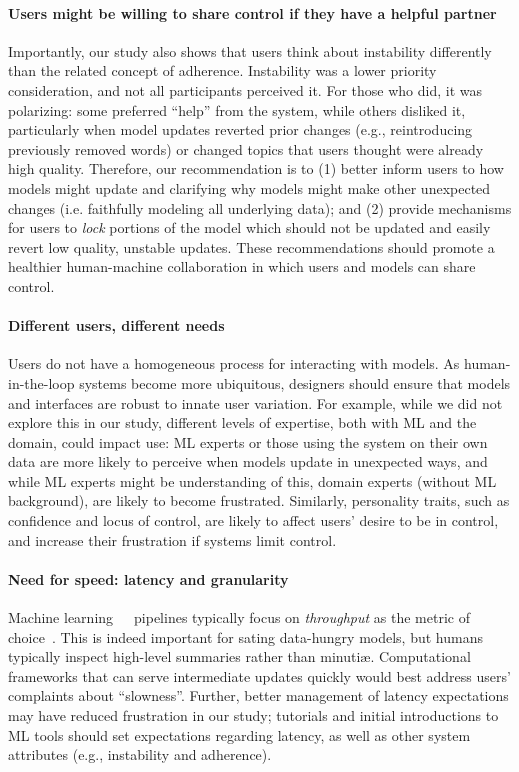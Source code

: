 \paragraph{Users might be willing to share control if they have a helpful partner}
Importantly, our study also shows that users think about instability differently than the related concept of adherence. Instability was a lower priority consideration, and not all participants perceived it. For those who did, it was polarizing: some preferred ``help'' from the system, while others disliked it, particularly when model updates reverted prior changes (e.g., reintroducing previously removed words) or changed topics that users thought were already high quality. Therefore, our recommendation is to (1) better inform users to how models might update and clarifying why models might make other unexpected changes (i.e. faithfully modeling all underlying data); and (2) provide mechanisms for users to \textit{lock} portions of the model which should not be updated and easily revert low quality, unstable updates. These recommendations should promote a healthier human-machine collaboration in which users and models can share control.  

\paragraph{Different users, different needs} 
Users do not have a homogeneous process for interacting with models.
As human-in-the-loop systems become more ubiquitous, designers should
ensure that models and interfaces are robust to innate user variation. For example, while we did not explore this in our study, different levels of expertise, both with ML and the domain, could impact use: ML experts or those using the system on their own data are more likely to perceive when models update in unexpected ways, and while ML experts might be understanding of this, domain experts (without ML background), are likely to become frustrated. Similarly, personality traits, such as confidence and locus of control, are likely to affect users' desire to be in control, and increase their frustration if systems limit control.

\paragraph{Need for speed: latency and granularity}
Machine learning~~~pipelines typically focus on \emph{throughput} as the
metric of choice~\citep{Landset2015AEcosystem,Gani2016AEvaluation}.  This is indeed important for sating data-hungry
models, but humans typically inspect high-level summaries rather than
minuti\ae{}.  Computational frameworks that can serve intermediate updates quickly would best address users' complaints
about ``slowness''. 
Further, better management of latency expectations may have reduced frustration in our study; tutorials and initial introductions to ML tools should set expectations regarding latency, as well as other system attributes (e.g., instability and adherence).  



